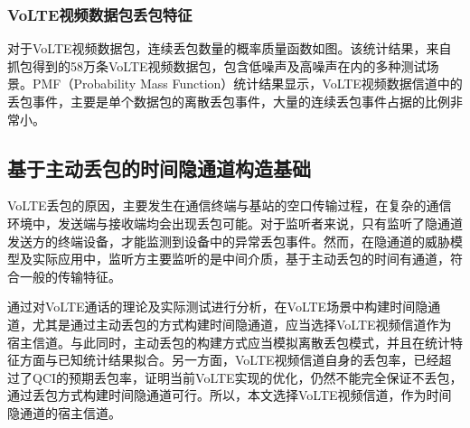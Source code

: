 \subsubsection{VoLTE视频数据包丢包特征}
\label{chap:backinfo:volte:packets:dropout}

对于VoLTE视频数据包，连续丢包数量的概率质量函数如图。该统计结果，来自抓包得到的58万条VoLTE视频数据包，包含低噪声及高噪声在内的多种测试场景。PMF（Probability Mass Function）统计结果显示，VoLTE视频数据信道中的丢包事件，主要是单个数据包的离散丢包事件，大量的连续丢包事件占据的比例非常小。

\subsection{基于主动丢包的时间隐通道构造基础}
\label{chap:backinfo:volte:scheme}
VoLTE丢包的原因，主要发生在通信终端与基站的空口传输过程，在复杂的通信环境中，发送端与接收端均会出现丢包可能。对于监听者来说，只有监听了隐通道发送方的终端设备，才能监测到设备中的异常丢包事件。然而，在隐通道的威胁模型及实际应用中，监听方主要监听的是中间介质，基于主动丢包的时间有通道，符合一般的传输特征。

通过对VoLTE通话的理论及实际测试进行分析，在VoLTE场景中构建时间隐通道，尤其是通过主动丢包的方式构建时间隐通道，应当选择VoLTE视频信道作为宿主信道。与此同时，主动丢包的构建方式应当模拟离散丢包模式，并且在统计特征方面与已知统计结果拟合。另一方面，VoLTE视频信道自身的丢包率，已经超过了QCI的预期丢包率，证明当前VoLTE实现的优化，仍然不能完全保证不丢包，通过丢包方式构建时间隐通道可行。所以，本文选择VoLTE视频信道，作为时间隐通道的宿主信道。